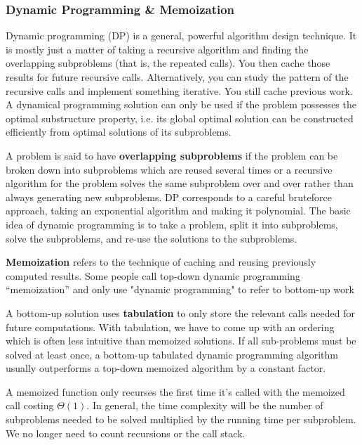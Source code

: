\documentclass{article}
\newcommand{\bigO}{\ensuremath{\mathcal{O}}}
\begin{document}
    \subsubsection{Dynamic Programming \& Memoization}
    Dynamic programming (DP) is a general, powerful algorithm design technique. It is mostly just a matter of taking a recursive algorithm and finding the overlapping subproblems (that is, the repeated calls). You then cache those results for future recursive calls. Alternatively, you can study the pattern of the recursive calls and implement something iterative. You still cache previous work. A dynamical programming solution can only be used if the problem possesses the optimal substructure property, i.e. its global optimal solution can be constructed efficiently from optimal solutions of its subproblems. 
    
    A problem is said to have \textbf{overlapping subproblems} if the problem can be broken down into subproblems which are reused several times or a recursive algorithm for the problem solves the same subproblem over and over rather than always generating new subproblems. DP corresponds to a careful bruteforce approach, taking an exponential algorithm and making it polynomial. The basic idea of dynamic programming is to take a problem, split it into subproblems, solve the subproblems, and re-use the solutions to the subproblems.

    \textbf{Memoization} refers to the technique of caching and reusing previously computed results. Some people call top-down dynamic programming ``memoization'' and only use "dynamic programming" to refer to bottom-up work
    
    A bottom-up solution uses \textbf{tabulation} to only store the relevant calls needed for future computations. With tabulation, we have to come up with an ordering which is often less intuitive than memoized solutions. If all sub-problems must be solved at least once, a bottom-up tabulated dynamic programming algorithm usually outperforms a top-down memoized algorithm by a constant factor.

    A memoized function only recurses the first time it's called with the memoized call costing $\Theta(1)$. In general, the time complexity will be the number of subproblems needed to be solved multiplied by the running time per subproblem. We no longer need to count recursions or the call stack.
    
    
\end{document}
